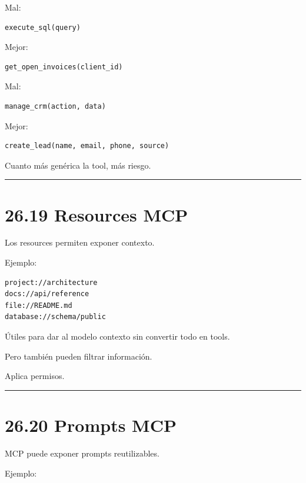 Mal:

\begin{lstlisting}
execute_sql(query)
\end{lstlisting}

Mejor:

\begin{lstlisting}
get_open_invoices(client_id)
\end{lstlisting}

Mal:

\begin{lstlisting}
manage_crm(action, data)
\end{lstlisting}

Mejor:

\begin{lstlisting}
create_lead(name, email, phone, source)
\end{lstlisting}

Cuanto más genérica la tool, más riesgo.

\begin{center}\rule{0.5\linewidth}{0.5pt}\end{center}

\section{26.19 Resources MCP}\label{resources-mcp}

Los resources permiten exponer contexto.

Ejemplo:

\begin{lstlisting}
project://architecture
docs://api/reference
file://README.md
database://schema/public
\end{lstlisting}

Útiles para dar al modelo contexto sin convertir todo en tools.

Pero también pueden filtrar información.

Aplica permisos.

\begin{center}\rule{0.5\linewidth}{0.5pt}\end{center}

\section{26.20 Prompts MCP}\label{prompts-mcp}

MCP puede exponer prompts reutilizables.

Ejemplo:

